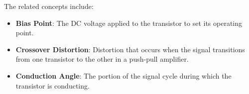 The related concepts include:
\begin{itemize}
    \item \textbf{Bias Point}: The DC voltage applied to the transistor to set its operating point.
    \item \textbf{Crossover Distortion}: Distortion that occurs when the signal transitions from one transistor to the other in a push-pull amplifier.
    \item \textbf{Conduction Angle}: The portion of the signal cycle during which the transistor is conducting.
\end{itemize}

